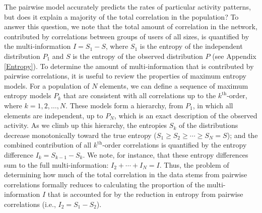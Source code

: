 \documentclass[aps,reprint,superscriptaddress,amsmath,amssymb,longbibliography]{revtex4-1}
\begin{document}
The pairwise model accurately predicts the rates of particular activity patterns, but does it explain a majority of the total correlation in the population? To answer this question, we note that the total amount of correlation in the network, contributed by correlations between groups of users of all sizes, is quantified by the multi-information $I=S_1 - S$, where $S_1$ is the entropy of the independent distribution $P_1$ and $S$ is the entropy of the observed distribution $P$ \cite{Cover-01} (see Appendix \ref{Entropy}). To determine the amount of multi-information that is contributed by pairwise correlations, it is useful to review the properties of maximum entropy models. For a population of $N$ elements, we can define a sequence of maximum entropy models $P_k$ that are consistent with all correlations up to the $k^{\text{th}}$-order, where $k=1,2,\hdots,N$. These models form a hierarchy, from $P_1$, in which all elements are independent, up to $P_N$, which is an exact description of the observed activity. As we climb up this hierarchy, the entropies $S_k$ of the distributions decrease monotonically toward the true entropy ($S_1\ge S_2\ge\cdots\ge S_N = S$); and the combined contribution of all $k^{\text{th}}$-order correlations is quantified by the entropy difference $I_k = S_{k-1} - S_k$. We note, for instance, that these entropy differences sum to the full multi-information: $I_2 + \cdots + I_N = I$. Thus, the problem of determining how much of the total correlation in the data stems from pairwise correlations formally reduces to calculating the proportion of the multi-information $I$ that is accounted for by the reduction in entropy from pairwise correlations (i.e., $I_2 = S_1 - S_2$).
\end{document}
